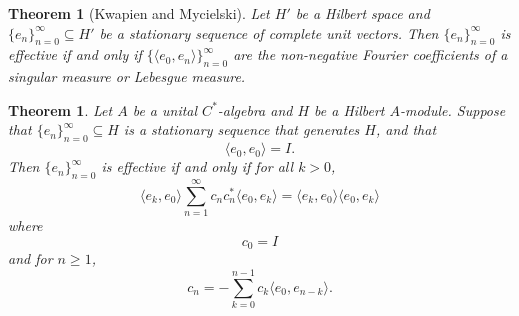 \documentclass[11pt]{amsart}
\newtheorem{thm}{Theorem}[section]
\newtheorem*{thm*}{Theorem}
\theoremstyle{definition}
\numberwithin{equation}{section}
\begin{document}
\begin{thm*}[Kwapien and Mycielski]

Let $H'$ be a Hilbert space and $\{e_{n}\}_{n=0}^{\infty}\subseteq H'$ be a stationary sequence of complete unit vectors. Then $\{e_{n}\}_{n=0}^{\infty}$ is effective if and only if $\{\langle e_{0}, e_{n}\rangle \}_{n=0}^{\infty}$ are the non-negative Fourier coefficients of a singular measure or Lebesgue measure.
\end{thm*}

\begin{thm}\label{stationarythm}
Let $A$ be a unital $C^{*}$-algebra and $H$ be a Hilbert $A$-module.
Suppose that $\{e_{n}\}_{n=0}^{\infty}\subseteq H$ is a stationary sequence that generates $H$, and that $$\langle e_{0},e_{0}\rangle=I.$$ Then $\{e_{n}\}_{n=0}^{\infty}$ is effective if and only if for all $k>0$,
$$\langle e_{k}, e_{0}\rangle \sum_{n=1}^{\infty}c_{n}c_{n}^{*}\langle e_{0},e_{k}\rangle =\langle e_{k}, e_{0}\rangle\langle e_{0},e_{k}\rangle$$ where $$c_{0}=I$$ and for $n\geq 1$, $$c_{n}=-\sum_{k=0}^{n-1}c_{k}\langle e_{0}, e_{n-k}\rangle.$$
\end{thm}
\end{document}

